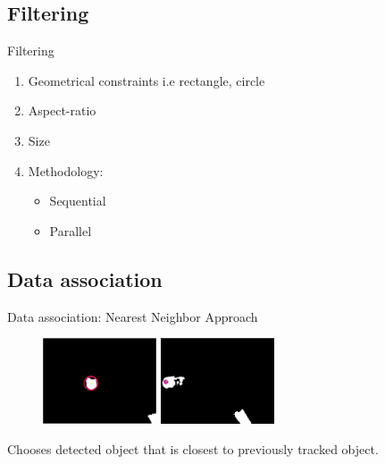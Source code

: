 \documentclass{beamer}
\begin{document}
\subsection{Filtering}
\begin{frame}{Filtering}
    \begin{enumerate}
        \item Geometrical constraints i.e rectangle, circle
        \item Aspect-ratio
        \item Size
        \item Methodology:
            \begin{itemize}
                \item Sequential
                \item Parallel
            \end{itemize}
    \end{enumerate}
\end{frame}

\subsection{Data association}
\begin{frame}{Data association: Nearest Neighbor Approach}
    \begin{figure}[ht]
        \centering
        \includegraphics[width=0.3\textwidth, height=0.3\textheight]{figs/redcoin_blob.png}\hspace{5em}
        \includegraphics[width=0.3\textwidth, height=0.3\textheight]{figs/redcoin_next.png}
    \end{figure}
    Chooses detected object that is closest to previously tracked object.
\end{frame}

\end{document}
